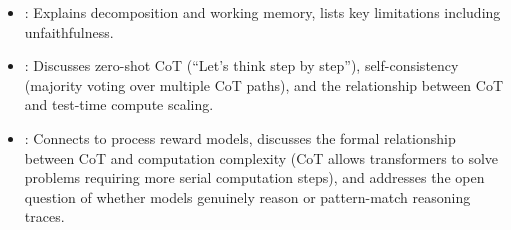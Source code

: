 \begin{interviewq}
\goodgreat
\begin{itemize}
\item {}: Explains decomposition and working memory, lists
  key limitations including unfaithfulness.
\item {}: Discusses zero-shot CoT (``Let's think step by step''),
  self-consistency (majority voting over multiple CoT paths), and the
  relationship between CoT and test-time compute scaling.
\item {}: Connects to process reward models, discusses the
  formal relationship between CoT and computation complexity (CoT allows
  transformers to solve problems requiring more serial computation steps),
  and addresses the open question of whether models genuinely reason or
  pattern-match reasoning traces.
\end{itemize}

\end{interviewq}

